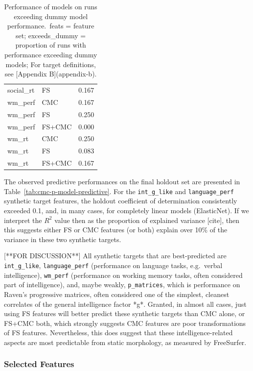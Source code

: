 \documentclass{article}
\begin{document}
\begin{table}
\begin{tabular}{llr}
	social\_rt & FS & 0.167 \\
	wm\_perf & CMC & 0.167 \\
	wm\_perf & FS & 0.250 \\
	wm\_perf & FS+CMC & 0.000 \\
	wm\_rt & CMC & 0.250 \\
	wm\_rt & FS & 0.083 \\
	wm\_rt & FS+CMC & 0.167 \\
	\bottomrule
\end{tabular}
\footnotesize
\caption{%
Performance of models on runs exceeding dummy model performance.\
feats = feature set;
exceeds\_dummy = proportion of runs with performance exceeding dummy models;
For target definitions, see [Appendix B](appendix-b).
}
\normalsize
\label{tab:cmc-p-predictive}
\end{table}



The observed predictive performances on the final holdout set are presented
in Table~\ref{tab:cmc-p-model-predictive}. For the \texttt{int\_g\_like} and
\texttt{language\_perf} synthetic target features, the holdout coefficient of
determination consistently exceeded 0.1, and, in many cases, for completely
linear models (ElasticNet). If we interpret the \(R^2\) value then as the
proportion of explained variance [cite], then this suggests either FS or CMC
features (or both) explain over 10\% of the variance in these two synthetic
targets.

[**FOR DISCUSSION**] All synthetic targets that are best-predicted are
\texttt{int\_g\_like}, \texttt{language\_perf} (performance on language
tasks, e.g.\ verbal intelligence), \texttt{wm\_perf} (performance on working
memory tasks, often considered part of intelligence), and, maybe weakly,
\texttt{p\_matrices}, which is performance on Raven's progressive matrices,
often considered one of the simplest, cleanest correlates of the general
intelligence factor *g*. Granted, in almost all cases, just using FS features
will better predict these synthetic targets than CMC alone, or FS+CMC both,
which strongly suggests CMC features are poor transformations of FS features.
Nevertheless, this does suggest that these intelligence-related aspects are
most predictable from static morphology, as measured by FreeSurfer.




\subsubsection{Selected Features}
\end{document}
